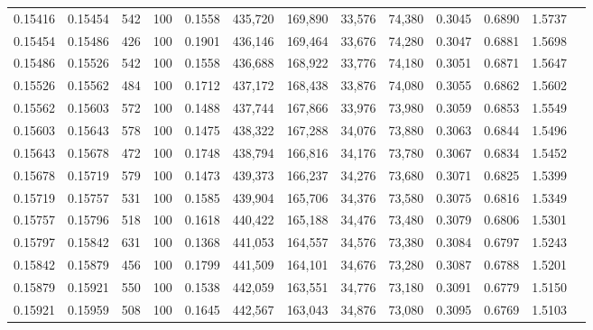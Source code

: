 \begin{tabular}{rrrrrrrrrrrrr}
0.15416 & 0.15454 &   542 & 100 &                                     0.1558 & 435,720 & 169,890 &  33,576 &  74,380 & 0.3045 & 0.6890 & 1.5737 \\
0.15454 & 0.15486 &   426 & 100 &                                     0.1901 & 436,146 & 169,464 &  33,676 &  74,280 & 0.3047 & 0.6881 & 1.5698 \\
0.15486 & 0.15526 &   542 & 100 &                                     0.1558 & 436,688 & 168,922 &  33,776 &  74,180 & 0.3051 & 0.6871 & 1.5647 \\
0.15526 & 0.15562 &   484 & 100 &                                     0.1712 & 437,172 & 168,438 &  33,876 &  74,080 & 0.3055 & 0.6862 & 1.5602 \\
0.15562 & 0.15603 &   572 & 100 &                                     0.1488 & 437,744 & 167,866 &  33,976 &  73,980 & 0.3059 & 0.6853 & 1.5549 \\
0.15603 & 0.15643 &   578 & 100 &                                     0.1475 & 438,322 & 167,288 &  34,076 &  73,880 & 0.3063 & 0.6844 & 1.5496 \\
0.15643 & 0.15678 &   472 & 100 &                                     0.1748 & 438,794 & 166,816 &  34,176 &  73,780 & 0.3067 & 0.6834 & 1.5452 \\
0.15678 & 0.15719 &   579 & 100 &                                     0.1473 & 439,373 & 166,237 &  34,276 &  73,680 & 0.3071 & 0.6825 & 1.5399 \\
0.15719 & 0.15757 &   531 & 100 &                                     0.1585 & 439,904 & 165,706 &  34,376 &  73,580 & 0.3075 & 0.6816 & 1.5349 \\
0.15757 & 0.15796 &   518 & 100 &                                     0.1618 & 440,422 & 165,188 &  34,476 &  73,480 & 0.3079 & 0.6806 & 1.5301 \\
0.15797 & 0.15842 &   631 & 100 &                                     0.1368 & 441,053 & 164,557 &  34,576 &  73,380 & 0.3084 & 0.6797 & 1.5243 \\
0.15842 & 0.15879 &   456 & 100 &                                     0.1799 & 441,509 & 164,101 &  34,676 &  73,280 & 0.3087 & 0.6788 & 1.5201 \\
0.15879 & 0.15921 &   550 & 100 &                                     0.1538 & 442,059 & 163,551 &  34,776 &  73,180 & 0.3091 & 0.6779 & 1.5150 \\
0.15921 & 0.15959 &   508 & 100 &                                     0.1645 & 442,567 & 163,043 &  34,876 &  73,080 & 0.3095 & 0.6769 & 1.5103 \\

\end{tabular}
